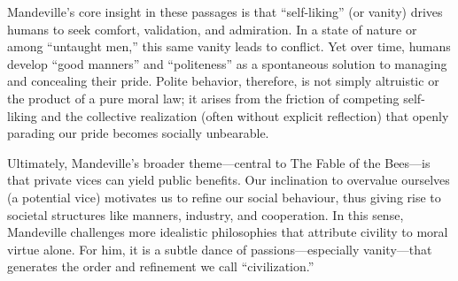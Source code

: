         Mandeville’s core insight in these passages is that “self-liking” (or vanity) drives humans to seek comfort, validation, and admiration. In a state of nature or among “untaught men,” this same vanity leads to conflict. Yet over time, humans develop “good manners” and “politeness” as a spontaneous solution to managing and concealing their pride. Polite behavior, therefore, is not simply altruistic or the product of a pure moral law; it arises from the friction of competing self-liking and the collective realization (often without explicit reflection) that openly parading our pride becomes socially unbearable.

        Ultimately, Mandeville’s broader theme—central to The Fable of the Bees—is that private vices can yield public benefits. Our inclination to overvalue ourselves (a potential vice) motivates us to refine our social behaviour, thus giving rise to societal structures like manners, industry, and cooperation. In this sense, Mandeville challenges more idealistic philosophies that attribute civility to moral virtue alone. For him, it is a subtle dance of passions—especially vanity—that generates the order and refinement we call “civilization.”
            